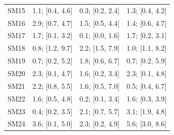 \documentclass[9pt,lineno,final]{elife}
\begin{document}
\begin{table}[H]
\begin{tabular}{lccc}
SM15     &  1.1; [0.4, 4.6] &  0.3; [0.2, 2.4] &  1.3; [0.4, 4.2] \\
SM16     &  2.9; [0.7, 4.7] &  1.5; [0.5, 4.4] &  1.4; [0.6, 4.7] \\
SM17     &  1.7; [0.1, 3.2] &  0.1; [0.0, 1.6] &  1.7; [0.2, 3.1] \\
SM18     &  0.8; [1.2, 9.7] &  2.2; [1.5, 7.9] &  1.0; [1.1, 8.2] \\
SM19     &  0.7; [0.2, 5.2] &  1.8; [0.6, 6.7] &  0.7; [0.2, 5.9] \\
SM20     &  2.3; [0.1, 4.7] &  1.6; [0.2, 3.4] &  2.3; [0.1, 4.8] \\
SM21     &  2.2; [0.8, 5.5] &  1.6; [0.5, 7.0] &  0.5; [0.4, 6.7] \\
SM22     &  1.6; [0.5, 4.8] &  0.2; [0.1, 3.4] &  1.6; [0.3, 3.9] \\
SM23     &  0.4; [0.2, 3.5] &  2.1; [0.7, 5.7] &  3.1; [1.9, 4.8] \\
SM24     &  3.6; [0.1, 5.0] &  2.3; [0.2, 4.9] &  5.6; [3.0, 8.6] \\
\bottomrule
\end{tabular}
 
\end{table}
\end{document}

